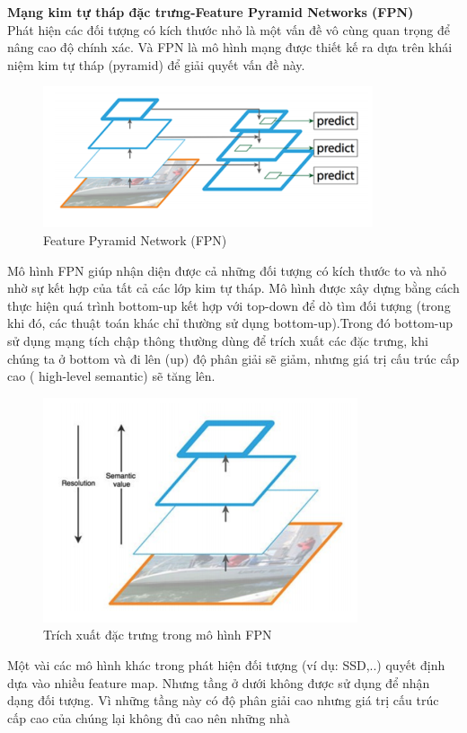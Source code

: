 \documentclass[a4paper, 12pt]{report}
\begin{document}
\textbf{Mạng kim tự tháp đặc trưng-Feature Pyramid Networks (FPN)}  \\
Phát hiện các đối tượng có kích thước nhỏ là một vấn đề vô cùng quan
trọng để nâng cao độ chính xác. Và FPN là mô hình mạng được thiết kế
ra dựa trên khái niệm kim tự tháp (pyramid) để giải quyết vấn đề này. \\
\begin{figure}[!h]
	\centering
	\includegraphics[width=0.5\linewidth]{Images/fpn1}
	\caption{Feature Pyramid Network (FPN)}
	\label{fig:resnet-fpn1}
\end{figure}
\hspace*{1cm}Mô hình FPN giúp nhận diện được cả những đối tượng có kích thước
to và nhỏ nhờ sự kết hợp của tất cả các lớp kim tự tháp. Mô hình được
xây dựng bằng cách thực hiện quá trình bottom-up kết hợp với top-down
để dò tìm đối tượng (trong khi đó, các thuật toán khác chỉ thường sử dụng
bottom-up).Trong đó bottom-up sử dụng mạng tích chập thông thường
dùng để trích xuất các đặc trưng, khi chúng ta ở bottom và đi lên (up) độ
phân giải sẽ giảm, nhưng giá trị cấu trúc cấp cao ( high-level semantic) sẽ
tăng lên. \\
\begin{figure}[!h]
	\centering
	\includegraphics[width=0.5\linewidth]{Images/fpn2}
	\caption{Trích xuất đặc trưng trong mô hình FPN}
	\label{fig:resnet-fpn2}
\end{figure}
\hspace*{1cm}Một vài các mô hình khác trong phát hiện đối tượng (ví dụ: SSD,..)
quyết định dựa vào nhiều feature map. Nhưng tầng ở dưới không được
sử dụng để nhận dạng đối tượng. Vì những tầng này có độ phân giải cao
nhưng giá trị cấu trúc cấp cao của chúng lại không đủ cao nên những nhà
\end{document}
